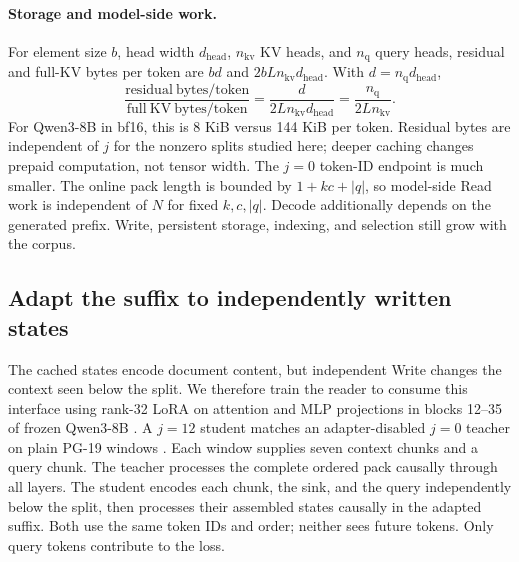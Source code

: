 \paragraph{Storage and model-side work.}
For element size $b$, head width $d_{\mathrm{head}}$, $n_{\mathrm{kv}}$ KV heads, and $n_{\mathrm q}$ query heads, residual and full-KV bytes per token are $bd$ and $2bLn_{\mathrm{kv}}d_{\mathrm{head}}$. With $d=n_{\mathrm q}d_{\mathrm{head}}$,
\begin{equation}
 \frac{\mathrm{residual\ bytes/token}}{\mathrm{full\ KV\ bytes/token}}
 =\frac{d}{2Ln_{\mathrm{kv}}d_{\mathrm{head}}}
 =\frac{n_{\mathrm q}}{2Ln_{\mathrm{kv}}}.
 \label{eq:storage}
\end{equation}
For Qwen3-8B in bf16, this is 8 KiB versus 144 KiB per token. Residual bytes are independent of $j$ for the nonzero splits studied here; deeper caching changes prepaid computation, not tensor width. The $j=0$ token-ID endpoint is much smaller. The online pack length is bounded by $1+kc+|q|$, so model-side Read work is independent of $N$ for fixed $k,c,|q|$. Decode additionally depends on the generated prefix. Write, persistent storage, indexing, and selection still grow with the corpus.

\subsection{Adapt the suffix to independently written states}
\label{sec:distill}
The cached states encode document content, but independent Write changes the context seen below the split. We therefore train the reader to consume this interface using rank-32 LoRA on attention and MLP projections in blocks 12--35 of frozen Qwen3-8B \citep{lora,qwen3}. A $j=12$ student matches an adapter-disabled $j=0$ teacher on plain PG-19 windows \citep{pg19,distillation}. Each window supplies seven context chunks and a query chunk. The teacher processes the complete ordered pack causally through all layers. The student encodes each chunk, the sink, and the query independently below the split, then processes their assembled states causally in the adapted suffix. Both use the same token IDs and order; neither sees future tokens. Only query tokens contribute to the loss.


